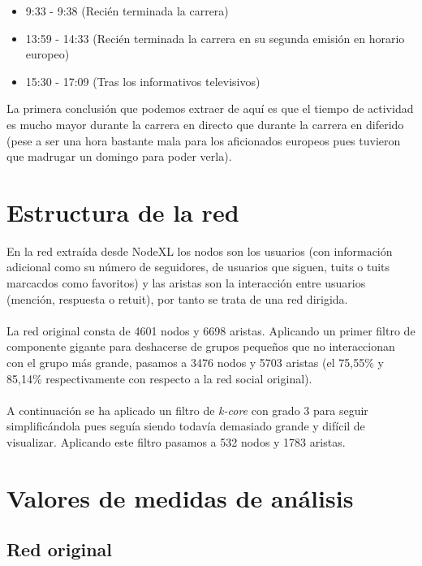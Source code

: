 \begin{itemize}
	\item 9:33 - 9:38 (Recién terminada la carrera)
	\item 13:59 - 14:33 (Recién terminada la carrera en su segunda emisión en horario europeo)
	\item 15:30 - 17:09 (Tras los informativos televisivos)
\end{itemize}

La primera conclusión que podemos extraer de aquí es que el tiempo de actividad es mucho mayor durante la carrera en directo que durante la carrera en diferido (pese a ser una hora bastante mala para los aficionados europeos pues tuvieron que madrugar un domingo para poder verla).

\section{Estructura de la red}

En la red extraída desde NodeXL los nodos son los usuarios (con información adicional como su número de seguidores, de usuarios que siguen, tuits o tuits marcacdos como favoritos) y las aristas son la interacción entre usuarios (mención, respuesta o retuit), por tanto se trata de una red dirigida.
\\ \\
La red original consta de 4601 nodos y 6698 aristas. Aplicando un primer filtro de componente gigante para deshacerse de grupos pequeños que no interaccionan con el grupo más grande, pasamos a 3476 nodos y 5703 aristas (el 75,55\% y 85,14\% respectivamente con respecto a la red social original).
\\ \\
A continuación se ha aplicado un filtro de \textit{k-core} con grado 3 para seguir simplificándola pues seguía siendo todavía demasiado grande y difícil de visualizar. Aplicando este filtro pasamos a 532 nodos y 1783 aristas.

\section{Valores de medidas de análisis}

\subsection{Red original}


